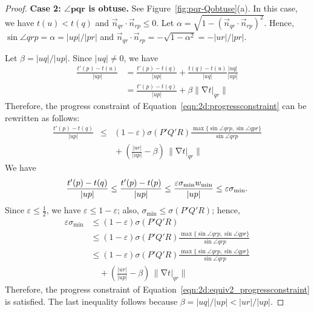 \documentclass[twocolumn]{article}
\def\minW{\ensuremath{w_{\text{min}}}}
\def\S{\ensuremath{\sigma}}
\def\minS{\ensuremath{\S_{\text{min}}}}
\def\e{\ensuremath{\varepsilon}}
\def\fp{\ensuremath{P}}
\def\fq{\ensuremath{Q}}
\def\fr{\ensuremath{R}}
\DeclareMathOperator{\grad}{\ensuremath{\nabla}}
\def\abs#1{\ensuremath{\mathopen| #1 \mathclose|}}
\def\norm#1{\ensuremath{\mathopen\| #1 \mathclose\|}}
\def\rest#1#2{\ensuremath{\left. #1 \right|_{#2}}}
\def\half{\ensuremath{\frac{1}{2}}}
\begin{document}
\begin{proof}
\noindent\textbf{Case 2: $\mathbf{\angle{pqr}}$ is obtuse.}
See Figure~\ref{fig:pqr-Qobtuse}(a).  In this case, we have $t(u) <
t(q)$ and $\vec{n}_{qr} \cdot \vec{n}_{rp} \le 0$.  Let $\alpha =
\sqrt{1 - (\vec{n}_{qr} \cdot \vec{n}_{rp})^2}$.  Hence, $\sin
\angle{qrp} = \alpha = \abs{up}/\abs{pr}$ and $\vec{n}_{qr} \cdot
\vec{n}_{rp} = - \sqrt{1 - \alpha^2} = - \abs{ur}/\abs{pr}$.

Let $\beta = \abs{uq}/\abs{up}$.  Since $\abs{uq} \ne 0$, we have
\begin{align*}
  \frac{t'(p) - t(u)}{\abs{up}}
&= 
  \frac{t'(p) - t(q)}{\abs{up}} 
+ 
  \frac{t(q) - t(u)}{\abs{uq}} \frac{\abs{uq}}{\abs{up}}\\
&= 
  \frac{t'(p) - t(q)}{\abs{up}} 
+ 
  \beta \norm{\grad \rest{t}{qr}}
\end{align*}
Therefore, the progress constraint of
Equation~\ref{eqn:2d:progressconstraint} can be rewritten as follows:
\begin{equation}
\begin{array}{rcl}
  \frac{t'(p) - t(q)}{\abs{up}}
&\le&
  (1-\e) \S(\fp'\fq'\fr) 
  \frac{\max\{\sin \angle{qrp}, \sin \angle{qpr}\}}{\sin \angle{qrp}}\\[2ex]
&&
  {}+{} \left( \frac{\abs{ur}}{\abs{up}} - \beta \right)
        \, \norm{\grad \rest{t}{qr}}
\end{array}
\label{eqn:2d:equiv2_progressconstraint}
\end{equation}
We have
\[
\frac{t'(p) - t(q)}{\abs{up}}
\le 
  \frac{t'(p) - t(p)}{\abs{up}}\\
\le
  \frac{\e \minS \minW}{\abs{up}}\\
\le
  \e \minS.
\]
Since $\e \le \half$, we have $\e \le 1-\e$; also, $\minS \le
\S(\fp'\fq'\fr)$; hence,
\begin{align*}
\e \minS
&\le
  (1-\e) \S(\fp'\fq'\fr)\\
&\le
  (1-\e) \S(\fp'\fq'\fr) 
  \frac{\max\{\sin \angle{qrp}, \sin \angle{qpr}\}}{\sin \angle{qrp}}\\
&\le
  (1-\e) \S(\fp'\fq'\fr) 
  \frac{\max\{\sin \angle{qrp}, \sin \angle{qpr}\}}{\sin \angle{qrp}}\\
&\quad {}+{} \left( \frac{\abs{ur}}{\abs{up}} - \beta \right)
        \, \norm{\grad \rest{t}{qr}}
\end{align*}
Therefore, the progress constraint of
Equation~\ref{eqn:2d:equiv2_progressconstraint} is satisfied.  The
last inequality follows because $\beta = \abs{uq}/\abs{up} <
\abs{ur}/\abs{up}$.



\end{proof}
\end{document}
